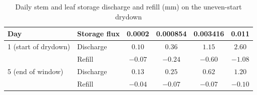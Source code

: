 \begin{table}[H]
\centering
\caption{Daily stem and leaf storage discharge and refill (mm) on the uneven-start drydown}
\label{tab:vwt_s2_one_daily_storage}
\begin{tabular}{llcccc}
\hline
Day & Storage flux & 0.0002 & 0.000854 & 0.003416 & 0.011 \\
\hline
1 (start of drydown) & Discharge & $0.10$ & $0.36$ & $1.15$ & $2.60$ \\
 & Refill & $-0.07$ & $-0.24$ & $-0.60$ & $-1.08$ \\
\hline
5 (end of window) & Discharge & $0.13$ & $0.25$ & $0.62$ & $1.20$ \\
 & Refill & $-0.04$ & $-0.07$ & $-0.07$ & $-0.10$ \\
\hline
\end{tabular}
\end{table}

